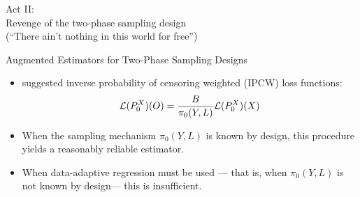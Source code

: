 \documentclass{beamer}
\begin{document}

\begin{frame}[standout]
  Act II:\\Revenge of the two-phase sampling design\\
  \footnotesize{(``There ain't nothing in this world for free'')}
\end{frame}


\begin{frame}[c]{Augmented Estimators for Two-Phase Sampling Designs}

\begin{center}
\begin{itemize}
  \itemsep8pt
  \item \cite{rose2011targeted2sd} suggested inverse probability of censoring
    weighted (IPCW) loss functions:
    \begin{equation*}
      \mathcal{L}(P_0^X)(O) = \frac{B}{\pi_0(Y, L)}\mathcal{L}(P_0^X)(X)
    \end{equation*}
  \item When the sampling mechanism $\pi_0(Y,L)$ is known by design, this
    procedure yields a reasonably reliable estimator.
  \item When data-adaptive regression must be used --- that is, when
    $\pi_0(Y,L)$ is not known by design\footnotemark --- this is insufficient.
\end{itemize}
\end{center}

\note{
}


\end{frame}

\end{document}
